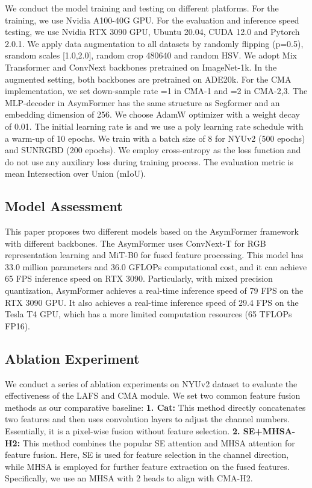 \documentclass[letterpaper, 10 pt, conference]{ieeeconf}
\begin{document}
We conduct the model training and testing on different platforms. For the training, we use Nvidia A100-40G GPU. For the evaluation and inference speed testing, we use Nvidia RTX 3090 GPU, Ubuntu 20.04, CUDA 12.0 and Pytorch 2.0.1. We apply data augmentation to all datasets by randomly flipping (p=0.5), srandom scales [1.0,2.0], random crop 480640 and random HSV. We adopt Mix Transformer\cite{xie2021segformer} and ConvNext\cite{liu2022convnet} backbones pretrained on ImageNet-1k\cite{deng2009imagenet}. In the augmented setting, both backbones are pretrained on ADE20k\cite{zhou2017scene}. For the CMA implementation, we set down-sample rate =1 in CMA-1 and =2 in CMA-2,3. The MLP-decoder in AsymFormer has the same structure as Segformer and an embedding dimension of 256. We choose AdamW optimizer with a weight decay of 0.01. The initial learning rate is  and we use a poly learning rate schedule  with a warm-up of 10 epochs. We train with a batch size of 8 for NYUv2 (500 epochs) and SUNRGBD (200 epochs). We employ cross-entropy as the loss function and do not use any auxiliary loss during training process. The evaluation metric is mean Intersection over Union (mIoU).


\subsection{Model Assessment}
This paper proposes two different models based on the AsymFormer framework with different backbones. The AsymFormer uses ConvNext-T\cite{liu2022convnet} for RGB representation learning and MiT-B0\cite{xie2021segformer} for fused feature processing. This model has 33.0 million parameters and 36.0 GFLOPs computational cost, and it can achieve 65 FPS inference speed on RTX 3090. Particularly, with mixed precision quantization, AsymFormer achieves a real-time inference speed of 79 FPS on the RTX 3090 GPU. It also achieves a real-time inference speed of 29.4 FPS on the Tesla T4 GPU, which has a more limited computation resources (65 TFLOPs FP16).


\subsection{Ablation Experiment}
We conduct a series of ablation experiments on NYUv2 dataset to evaluate the effectiveness of the LAFS and CMA module. We set two common feature fusion methods as our comparative baseline: \textbf{1. Cat:} This method directly concatenates two features and then uses convolution layers to adjust the channel numbers. Essentially, it is a pixel-wise fusion without feature selection. \textbf{2. SE+MHSA-H2:} This method combines the popular SE attention \cite{hu2018squeeze} and MHSA attention \cite{vaswani2017attention} for feature fusion. Here, SE is used for feature selection in the channel direction, while MHSA is employed for further feature extraction on the fused features. Specifically, we use an MHSA with 2 heads to align with CMA-H2.
\end{document}
